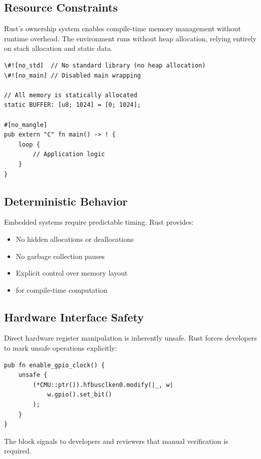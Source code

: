\subsection{Resource Constraints}

Rust's ownership system enables compile-time memory management without runtime overhead. The  environment runs without heap allocation, relying entirely on stack allocation and static data.

\begin{verbatim}
\#![no_std]  // No standard library (no heap allocation)
\#![no_main] // Disabled main wrapping

// All memory is statically allocated
static BUFFER: [u8; 1024] = [0; 1024];

#[no_mangle]
pub extern "C" fn main() -> ! {
    loop {
        // Application logic
    }
}
\end{verbatim}

\subsection{Deterministic Behavior}

Embedded systems require predictable timing. Rust provides:

\begin{itemize}
    \item No hidden allocations or deallocations
    \item No garbage collection pauses
    \item Explicit control over memory layout
    \item {} for compile-time computation
\end{itemize}

\subsection{Hardware Interface Safety}

Direct hardware register manipulation is inherently unsafe. Rust forces developers to mark unsafe operations explicitly:

\begin{verbatim}
pub fn enable_gpio_clock() {
    unsafe {
        (*CMU::ptr()).hfbusclken0.modify(|_, w|
            w.gpio().set_bit()
        );
    }
}
\end{verbatim}

The  block signals to developers and reviewers that manual verification is required.

